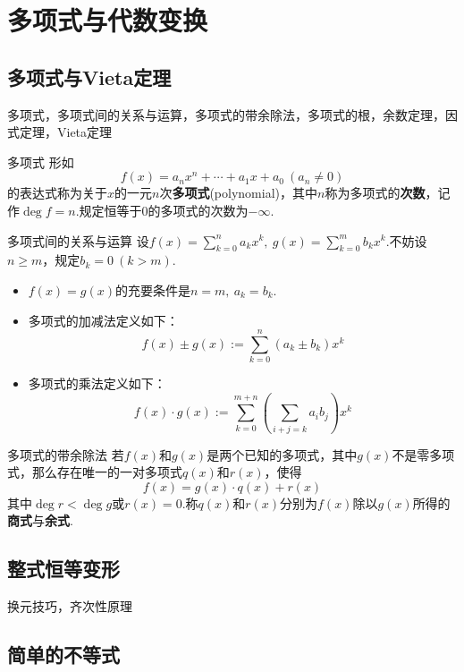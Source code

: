 \documentclass[lang=cn, zihao=4.5]{elegantbook}
\newcommand{\ssb}[1]{\left( #1 \right)}
\begin{document}
\chapter{多项式与代数变换}

\section{多项式与Vieta定理}

多项式，多项式间的关系与运算，多项式的带余除法，多项式的根，余数定理，因式定理，Vieta定理

\begin{definition}{多项式}
	形如$$f(x) = a_nx^n + \cdots + a_1x + a_0~(a_n \neq 0)$$的表达式称为关于$x$的一元$n$次\textbf{多项式}(polynomial)，其中$n$称为多项式的\textbf{次数}，记作$\deg f = n$.规定恒等于$0$的多项式的次数为$-\infty$.
\end{definition}

\begin{definition}{多项式间的关系与运算}
	设$f(x) = \sum_{k=0}^{n}a_kx^k,~g(x) = \sum_{k=0}^{m}b_kx^k$.不妨设$n \geq m$，规定$b_k=0~(k > m)$.
	\begin{itemize}
		\item $f(x)=g(x)$的充要条件是$n=m,~a_k=b_k$.
		\item 多项式的加减法定义如下：$$f(x) \pm g(x) := \sum_{k=0}^{n} (a_k \pm b_k)x^{k}$$
		\item 多项式的乘法定义如下：$$f(x) \cdot g(x) := \sum_{k=0}^{m+n} \ssb{\sum_{i+j=k}a_ib_j}x^k$$
	\end{itemize}
\end{definition}

\begin{proposition}{多项式的带余除法}
	若$f(x)$和$g(x)$是两个已知的多项式，其中$g(x)$不是零多项式，那么存在唯一的一对多项式$q(x)$和$r(x)$，使得$$f(x) = g(x) \cdot q(x) + r(x)$$其中$\deg r < \deg g$或$r(x)=0$.称$q(x)$和$r(x)$分别为$f(x)$除以$g(x)$所得的\textbf{商式}与\textbf{余式}.
\end{proposition}

\section{整式恒等变形}

换元技巧，齐次性原理

\section{简单的不等式}
\end{document}
